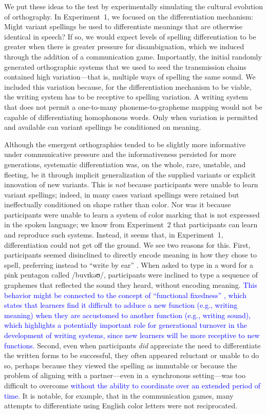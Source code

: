 \documentclass[doc,biblatex]{apa7}
\newcommand\newmaterial[1]{\textcolor{blue}{#1}}
\begin{document}
We put these ideas to the test by experimentally simulating the cultural evolution of orthography. In Experiment~1, we focused on the differentiation mechanism: Might variant spellings be used to differentiate meanings that are otherwise identical in speech? If so, we would expect levels of spelling differentiation to be greater when there is greater pressure for disambiguation, which we induced through the addition of a communication game. Importantly, the initial randomly generated orthographic systems that we used to seed the transmission chains contained high variation---that is, multiple ways of spelling the same sound. We included this variation because, for the differentiation mechanism to be viable, the writing system has to be receptive to spelling variation. A writing system that does not permit a one-to-many phoneme-to-grapheme mapping would not be capable of differentiating homophonous words. Only when variation is permitted and available can variant spellings be conditioned on meaning.

Although the emergent orthographies tended to be slightly more informative under communicative pressure and the informativeness persisted for more generations, systematic differentiation was, on the whole, rare, unstable, and fleeting, be it through implicit generalization of the supplied variants or explicit innovation of new variants. This is \textit{not} because participants were unable to learn variant spellings; indeed, in many cases variant spellings were retained but ineffectually conditioned on shape rather than color. Nor was it because participants were unable to learn a system of color marking that is not expressed in the spoken language; we know from Experiment~2 that participants can learn and reproduce such systems. Instead, it seems that, in Experiment~1, differentiation could not get off the ground. We see two reasons for this. First, participants seemed disinclined to directly encode meaning in how they chose to spell, preferring instead to ``write by ear'' \parencite{Frith:1979}. When asked to type in a word for a pink pentagon called /buvɪkəʊ/, participants were inclined to type a sequence of graphemes that reflected the sound they heard, without encoding meaning. \newmaterial{This behavior might be connected to the concept of ``functional fixedness'' \parencite{German:2000}, which states that learners find it difficult to adduce a new function (e.g., writing meaning) when they are accustomed to another function (e.g., writing sound), which highlights a potentially important role for generational turnover in the development of writing systems, since new learners will be more receptive to new functions.} Second, even when participants \textit{did} appreciate the need to differentiate the written forms to be successful, they often appeared reluctant or unable to do so, perhaps because they viewed the spelling as immutable or because the problem of aligning with a partner---even in a~synchronous setting---was too difficult to overcome \newmaterial{without the ability to coordinate over an extended period of time}. It is notable, for example, that in the communication games, many attempts to differentiate using English color letters were not reciprocated.
\end{document}
